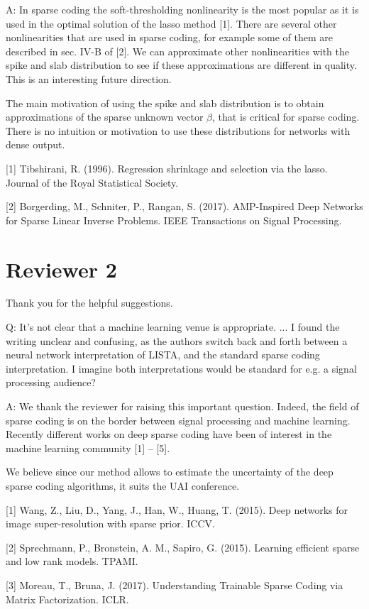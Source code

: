 \documentclass{article}
\begin{document}
A: In sparse coding the soft-thresholding nonlinearity is the most popular as it is used in the optimal solution of the lasso method [1]. There are several other nonlinearities that are used in sparse coding, for example some of them are described in sec. IV-B of [2]. We can approximate other nonlinearities with the spike and slab distribution to see if these approximations are different in quality. This is an interesting future direction.

The main motivation of using the spike and slab distribution is to obtain approximations of the sparse unknown vector $\beta$, that is critical for sparse coding. There is no intuition or motivation to use these distributions for networks with dense output.

[1] Tibshirani, R. (1996). Regression shrinkage and selection via the lasso. Journal of the Royal Statistical Society.

[2] Borgerding, M., Schniter, P., Rangan, S. (2017). AMP-Inspired Deep Networks for Sparse Linear Inverse Problems. IEEE Transactions on Signal Processing.

\section*{Reviewer 2}
Thank you for the helpful suggestions.

Q: It's not clear that a machine learning venue is appropriate. ... I found the writing unclear and confusing, as the authors switch back and forth between a neural network interpretation of LISTA, and the standard sparse coding interpretation. I imagine both interpretations would be standard for e.g. a signal processing audience?

A: We thank the reviewer for raising this important question. Indeed, the field of sparse coding is on the border between signal processing and machine learning. Recently different works on deep sparse coding have been of interest in the machine learning community [1] -- [5].

We believe since our method allows to estimate the uncertainty of the deep sparse coding algorithms, it suits the UAI conference.

[1] Wang, Z., Liu, D., Yang, J., Han, W., Huang, T. (2015). Deep networks for image super-resolution with sparse prior. ICCV.

[2] Sprechmann, P., Bronstein, A. M., Sapiro, G. (2015). Learning efficient sparse and low rank models. TPAMI.

[3] Moreau, T., Bruna, J. (2017). Understanding Trainable Sparse Coding via Matrix Factorization. ICLR.
\end{document}
